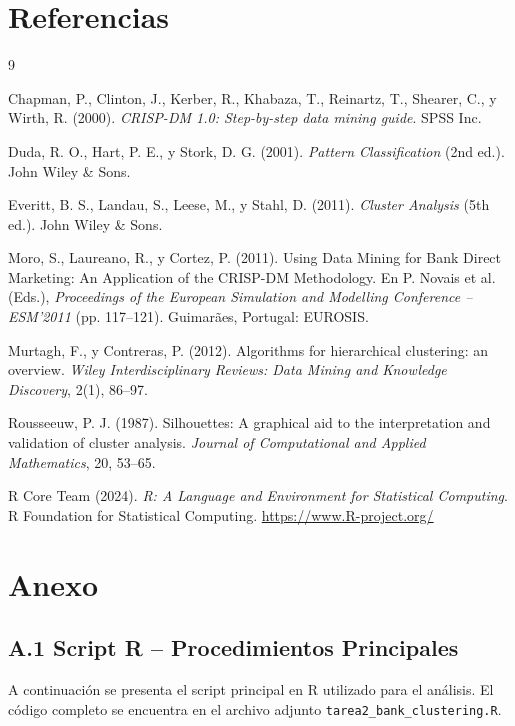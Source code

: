 \documentclass[10pt,a4paper]{article}
\begin{document}
\section{Referencias}
\small
\begin{thebibliography}{9}

Chapman, P., Clinton, J., Kerber, R., Khabaza, T., Reinartz, T., Shearer, C., y Wirth, R. (2000).
\textit{CRISP-DM 1.0: Step-by-step data mining guide}. SPSS Inc.

Duda, R. O., Hart, P. E., y Stork, D. G. (2001).
\textit{Pattern Classification} (2nd ed.). John Wiley \& Sons.

Everitt, B. S., Landau, S., Leese, M., y Stahl, D. (2011).
\textit{Cluster Analysis} (5th ed.). John Wiley \& Sons.

Moro, S., Laureano, R., y Cortez, P. (2011). Using Data Mining for Bank Direct Marketing: An Application of the CRISP-DM Methodology. En P. Novais et al. (Eds.), \textit{Proceedings of the European Simulation and Modelling Conference -- ESM'2011} (pp. 117--121). Guimarães, Portugal: EUROSIS.

Murtagh, F., y Contreras, P. (2012). Algorithms for hierarchical clustering: an overview.
\textit{Wiley Interdisciplinary Reviews: Data Mining and Knowledge Discovery}, 2(1), 86--97.

Rousseeuw, P. J. (1987). Silhouettes: A graphical aid to the interpretation and validation of cluster analysis.
\textit{Journal of Computational and Applied Mathematics}, 20, 53--65.

R Core Team (2024). \textit{R: A Language and Environment for Statistical Computing}. R Foundation for Statistical Computing. \url{https://www.R-project.org/}

\end{thebibliography}

\newpage
\section*{Anexo}

\subsection*{A.1 Script R -- Procedimientos Principales}

A continuación se presenta el script principal en R utilizado para el análisis. El código completo se encuentra en el archivo adjunto \texttt{tarea2\_bank\_clustering.R}.
\end{document}
